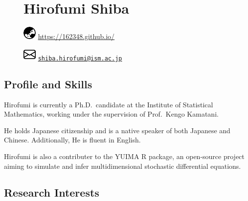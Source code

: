 \documentclass[
]{article}
\date{}
\begin{document}
\begin{figure}

\begin{minipage}{0.50\linewidth}

\section{\texorpdfstring{\Huge Hirofumi
Shiba}{Hirofumi Shiba}}\label{hirofumi-shiba}

\end{minipage}%
%
\begin{minipage}{0.50\linewidth}

\hfill \includegraphics{cv_files/mediabag/globe-asia-australia.pdf}
\url{https://162348.github.io/}

\par

\hfill \includegraphics{cv_files/mediabag/envelope.pdf}
\href{mailto:shiba.hirofumi@ism.ac.jp}{\nolinkurl{shiba.hirofumi@ism.ac.jp}}\end{minipage}%

\end{figure}%

\vspace{-1em}

\subsection{Profile and Skills}\label{profile-and-skills}

Hirofumi is currently a Ph.D.~candidate at the Institute of Statistical
Mathematics, working under the supervision of Prof.~Kengo Kamatani.

He holds Japanese citizenship and is a native speaker of both Japanese
and Chinese. Additionally, He is fluent in English.

Hirofumi is also a contributer to the YUIMA R package, an open-source
project aiming to simulate and infer multidimensional stochastic
differential equations.

\subsection{Research Interests}\label{research-interests}
\end{document}
